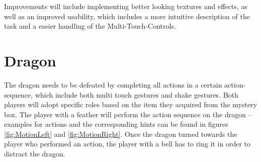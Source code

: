 \documentclass{sigchi-ext}
\begin{document}
Improvements will include implementing better looking textures and effects, as well as an improved usability, which includes a more intuitive description of the task and a easier handling of the Multi-Touch-Controls.

\section{Dragon}

The dragon needs to be defeated by completing all actions in a certain action-sequence, which include both multi touch gestures and shake gestures. Both players will adopt specific roles based on the item they acquired from the mystery box. The player with a feather will perform the action sequence on the dragon -- examples for actions and the corresponding hints can be found in figures \ref{fig:MotionLeft} and \ref{fig:MotionRight}. Once the dragon turned towards the player who performed an action, the player with a bell has to ring it in order to distract the dragon.
\end{document}
